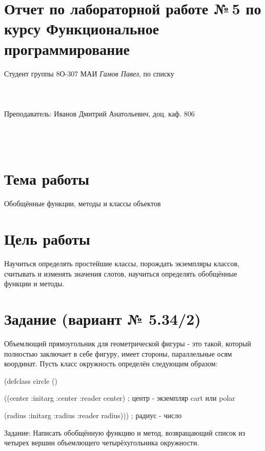 \documentclass[15pt]{extarticle}
\begin{document}
\section*{Отчет по лабораторной работе №\,5
по курсу \guillemotleft  Функциональное программирование\guillemotright}

\begin{flushright}
Студент группы 8О-307 МАИ \textit{Гамов Павел},  по списку \\
 \\
 \\
\ \\
Преподаватель: Иванов Дмитрий Анатольевич, доц. каф. 806 \\
 \\
 \\
 \\

\end{flushright}

\section{Тема работы}
Обобщённые функции, методы и классы объектов

\section{Цель работы}
Научиться определять простейшие классы, порождать экземпляры классов, считывать и изменять значения слотов, научиться определять обобщённые функции и методы.

\section{Задание (вариант № 5.34/2)}
Объемлющий прямоугольник для геометрической фигуры - это такой, который
полностью заключает в себе фигуру,
имеет стороны, параллельные осям координат.
Пусть класс окружность определён следующим образом:

(defclass circle ()

 ((center :initarg :center :reader center)   ; центр - экземпляр cart или polar
 
  (radius :initarg :radius :reader radius))) ; радиус - число
  
Задание: Написать обобщённую функцию и метод, возвращающий список из четырех вершин объемлющего четырёхугольника окружности.
\end{document}
